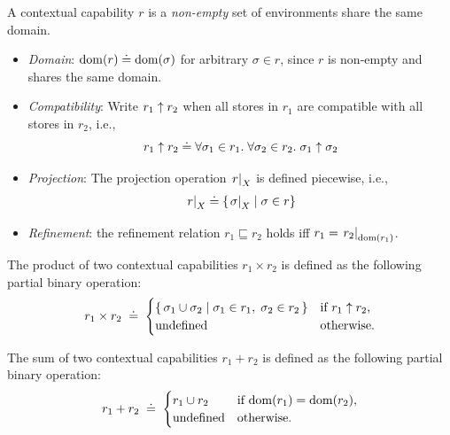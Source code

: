 \begin{definition}\label{def:contextual-capability-details}
A contextual capability $r$ is a \emph{non-empty} set of environments share the same domain.
\begin{itemize}
  \item \emph{Domain}: $\mathrm{dom}(r) \doteq \mathrm{dom}(\sigma)$ for arbitrary $\sigma \in r$, since $r$ is non-empty and shares the same domain.
  \item \emph{Compatibility}: Write $r_1 \mathrel{\uparrow} r_2$ when all stores in $r_1$ are compatible with all stores in $r_2$, i.e.,
    \[
      r_1 \mathrel{\uparrow} r_2
      \doteq
      \forall \sigma_1 \in r_1.\;\forall \sigma_2 \in r_2.\; \sigma_1 \mathrel{\uparrow} \sigma_2
    \]
  \item \emph{Projection}: The projection operation $\left.{r}\right|_{X}$ is defined piecewise, i.e.,
  \begin{align*}
    \left.{r}\right|_{X} \doteq \{ \left.{\sigma}\right|_{X} \mid \sigma \in r \}
  \end{align*}
  \item \emph{Refinement}: the refinement relation $r_1 \sqsubseteq r_2$ holds iff $r_1 = \left.{r_2}\right|_{\mathrm{dom}(r_1)} $.
\end{itemize}
\end{definition}

\begin{definition}\label{def:contextual-capabilities-product}
  The product of two contextual capabilities $r_1 \times r_2$ is defined
  as the following  partial binary operation:
  \[
    r_1 \times r_2 \;\doteq\;
    \begin{cases}
      \{\, \sigma_1 \cup \sigma_2 \mid \sigma_1 \in r_1,\; \sigma_2 \in r_2 \,\}
        & \text{if } r_1 \mathrel{\uparrow} r_2, \\
        \text{undefined}
        & \text{otherwise.}
      \end{cases}
  \]
\end{definition}

\begin{definition}\label{def:contextual-capabilities-sum}
  The sum of two contextual capabilities $r_1 + r_2$ is defined
  as the following partial binary operation:
  \[
    r_1 + r_2 \;\doteq\;
    \begin{cases}
      r_1 \cup r_2
        & \text{if } \mathrm{dom}(r_1) = \mathrm{dom}(r_2), \\
        \text{undefined}
        & \text{otherwise.}
      \end{cases}
  \]
\end{definition}

